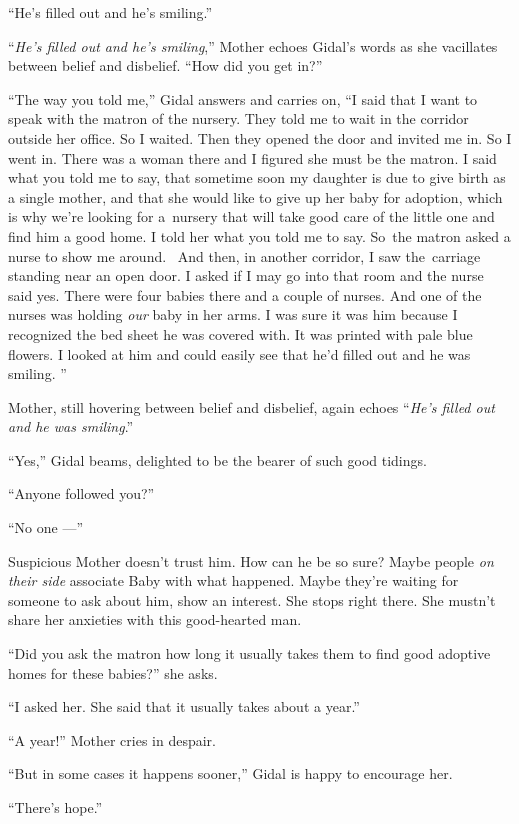 \documentclass[twoside,11pt]{book}
\begin{document}
``He's filled out and he's smiling.''

``\textit{He's filled out and he{'}s smiling},'' Mother echoes Gidal's words as
she vacillates between belief and disbelief. ``How did you get in?''

``The way you told me,'' Gidal answers and carries on, ``I said that I want to
speak with the matron of the nursery. They told me to wait in the corridor outside her office. So I waited. Then they
opened the door and invited me in. So I went in. There was a woman there and I figured she must be the matron. I said
what you told me to say, that sometime soon my daughter is due to give birth as a single mother, and that she would
like to give up her baby for adoption, which is why we're looking for a~nursery that will take good care of the little
one and find him a good home. I told her what you told me to say. So~the matron asked a nurse to show me around.~ And
then, in another corridor, I saw the~carriage standing near an open door. I asked if I may go into that room and the
nurse said yes. There were four babies there and a couple of nurses. And one of the nurses was holding\textit{ our
}baby in her arms. I was sure it was him because I recognized the bed sheet he was covered with. It was printed with
pale blue flowers. I looked at him and could easily see that he'd filled out and he was smiling. ''

Mother, still hovering between belief and disbelief, again{ }echoes
``\textit{He's filled out and he was smiling}.''

``Yes,'' Gidal beams, delighted to be the bearer of such good tidings.

``Anyone followed you?''

``No one ---''

Suspicious{ }Mother doesn't trust him. How can he be so sure? Maybe people
\textit{on their side} associate Baby with what happened. Maybe they're waiting for someone to ask about him, show an
interest. She stops right there. She mustn't share her anxieties with this good-hearted man.

``Did you ask the matron how long it usually takes them to find good adoptive homes for these
babies?'' she asks.

``I asked her. She said that it usually takes about a year.''

``A year!'' Mother cries in despair.

``But in some cases it happens sooner,'' Gidal is happy to encourage her.

``There's hope.''
\end{document}
